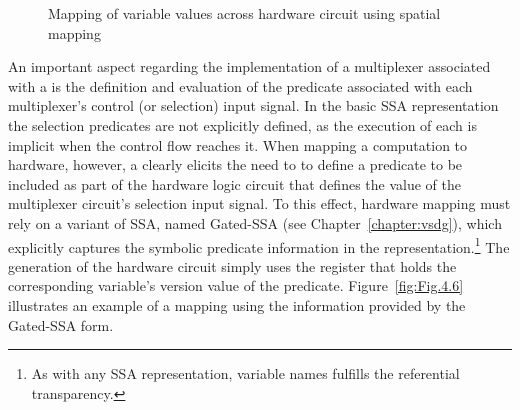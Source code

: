 \begin{figure}[htbp]
\centering
  
\caption{Mapping of variable values across hardware circuit using spatial mapping}
\label{fig:Fig.4.5}
\end{figure}

An important aspect regarding the implementation of a multiplexer associated with a \phifun is the definition and evaluation of the predicate associated with each multiplexer's control (or selection) input signal. 
In the basic SSA representation the selection predicates are not explicitly defined, as the execution of each \phifun is implicit when the control flow reaches it. 
When mapping a computation to hardware, however, a \phifun clearly elicits the need to  to define a predicate to be included as part of the hardware logic circuit that defines the value of the multiplexer circuit's selection input signal.  
To this effect, hardware mapping must rely on a variant of SSA, named Gated-SSA  (see Chapter~\ref{chapter:vsdg}), which explicitly captures the symbolic predicate information in the representation.\footnote{As with any SSA representation,   variable names  fulfills the referential transparency. }
The generation of the hardware circuit simply uses the register that holds the corresponding variable's version value of the predicate.
Figure~\ref{fig:Fig.4.6} illustrates an example of a mapping using the information provided by the Gated-SSA form.

